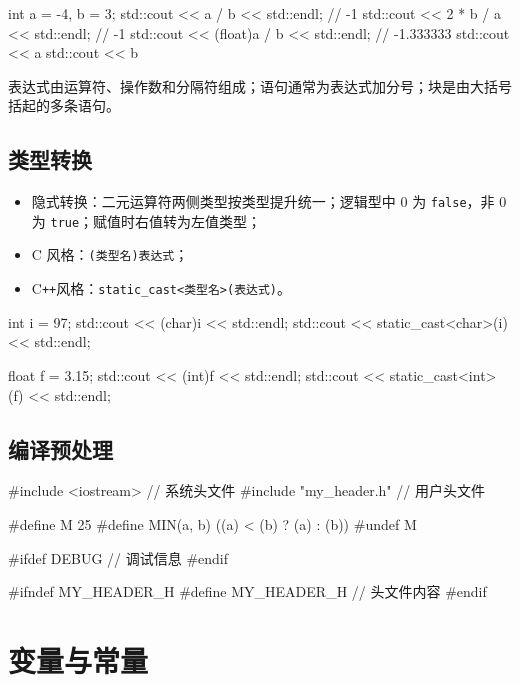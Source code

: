 \documentclass[UTF8,fontset=fandol,zihao=5]{ctexart}
\newcommand{\code}[1]{\texttt{#1}}
\newcommand{\cpp}{C\texttt{++}}
\begin{document}
\begin{cppcode}[整数除法与取余]
int a = -4, b = 3;
std::cout << a / b << std::endl;          // -1
std::cout << 2 * b / a << std::endl;      // -1
std::cout << (float)a / b << std::endl;   // -1.333333
std::cout << a %
std::cout << b %
\end{cppcode}

表达式由运算符、操作数和分隔符组成；语句通常为表达式加分号；块是由大括号括起的多条语句。

\subsection{类型转换}

\begin{itemize}
  \item 隐式转换：二元运算符两侧类型按类型提升统一；逻辑型中 $0$ 为 \code{false}，非 $0$ 为 \code{true}；赋值时右值转为左值类型；
  \item C 风格：\code{(类型名)表达式}；
  \item \cpp 风格：\code{static\_cast<类型名>(表达式)}。
\end{itemize}

\begin{cppcode}[强制类型转换]
int i = 97;
std::cout << (char)i << std::endl;
std::cout << static_cast<char>(i) << std::endl;

float f = 3.15;
std::cout << (int)f << std::endl;
std::cout << static_cast<int>(f) << std::endl;
\end{cppcode}

\subsection{编译预处理}

\begin{cppcode}[头文件与宏]
#include <iostream>       // 系统头文件
#include "my_header.h"    // 用户头文件

#define M 25
#define MIN(a, b) ((a) < (b) ? (a) : (b))
#undef M
\end{cppcode}

\begin{cppcode}[条件编译]
#ifdef DEBUG
// 调试信息
#endif

#ifndef MY_HEADER_H
#define MY_HEADER_H
// 头文件内容
#endif
\end{cppcode}

\section{变量与常量}
\end{document}
